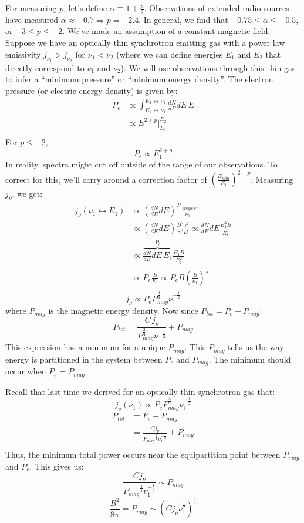 \documentclass{article}
\def\hf{\frac12}
\def\eval#1{\big|_{#1}}
\def\eval#1{\big|_{#1}}
\def\hf{\frac12}
\begin{document}
For measuring $p$, let's define $\alpha\equiv{1+\frac{p}{2}}$.
Observations of extended radio sources have measured $\alpha\approx-0.7
\Rightarrow p=-2.4$.  In general, we find that $-0.75\le\alpha\le-0.5$, or
$-3\le p\le -2$.  
We've made an assumption of a constant magnetic field.
Suppose we have an optically thin synchrotron emitting gas with a power law
emissivity
$j_{\nu_1}>j_{\nu_2}$ for $\nu_1<\nu_2$ (where we can define energies $E_1$ and $E_2$ that directly correspond to $\nu_1$ and $\nu_2$).  We will use observations through
this thin gas to infer a ``minimum pressure'' or ``minimum energy density''.  
The electron pressure (or electric energy density) is given by:
$$\begin{aligned}P_e&\propto\int_{E_1\leftrightarrow\nu_1}^{E_2\leftrightarrow\nu_2}
{\frac{dN }{ dE}dE\,E}\\ 
&\propto E^{2+p}\eval{E_1}^{E_2}\\ \end{aligned}$$
For $p\le-2$,
$$P_e\propto E_1^{2+p}$$
In reality, spectra might cut off outside of the range of our observations.
To correct for this, we'll carry around a correction factor of $\left(\frac{E_{min}
}{ E_1}\right)^{2+p}$.  Measuring $j_\nu$, we get:
$$\begin{aligned}j_\nu(\nu_1\leftrightarrow E_1)&\propto\left(\frac{dN}{ dE}dE\right)\frac{P
\eval{single\ e^-}}{\nu_1}\\ 
&\propto\left(\frac{dN}{ dE}dE\right)\frac{B^2\gamma^2}{\gamma^2 B}
\propto\frac{dN}{dE}dE\frac{E_1^2B}{ E_1^2}\\ 
&\propto\overbrace{\frac{dN}{ dE}dE\,E_1}^{P_e}\frac{E_1B}{ E_1^2}\\ 
&\propto P_e\frac{B}{E_1}\propto P_eB\left(\frac{B}{\nu_1}\right)^\hf\\ \end{aligned}$$
$$j_\nu\propto P_eP_{mag}^\frac{3}{4}\nu_1^{-\hf}$$
where $P_{mag}$ is the magnetic energy density.    
Now since $P_{tot}=P_e+P_{mag}$:
$$\boxed{P_{tot}=\frac{C\,j_\nu}{ P_{mag}^\frac{3}{4}\nu^{-\hf}}+P_{mag}}$$
This expression has a minimum for a unique $P_{mag}$.  This $P_{mag}$ tells
us the way energy is partitioned in the system between $P_e$ and $P_{mag}$.
The minimum should occur when $P_e=P_{mag}$.



Recall that last time we derived for an optically thin synchrotron gas that:
\def\pmag{{P_{mag}}}
$$j_\nu(\nu_1)\propto P_eP_{mag}^\frac{3}{4}\nu_1^{-\hf}$$
$$\begin{aligned}P_{tot}&=P_e+P_{mag}\\ 
&=\frac{Cj_\nu}{\pmag^\frac{3}{4}\nu_1^{-\hf}}+\pmag\\ \end{aligned}$$
Thus, the minimum total power occurs near the equipartition point between
$\pmag$ and $P_e$.  This gives us:
\def\jn{j_\nu}
$$\frac{C\jn}{\pmag^\frac{3}{4}\nu_1^{-\hf}}\sim\pmag$$
$$\frac{B^2}{8\pi}=\pmag\sim(C\jn\nu_1^\hf)^\frac{4}{7}$$
\end{document}
